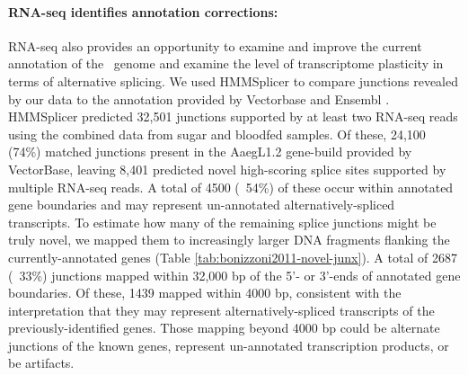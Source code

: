 \paragraph*{RNA-seq identifies annotation corrections:}





RNA-seq also provides an opportunity to examine and improve the current annotation of the \Aa\  genome and examine the level of transcriptome plasticity in terms of alternative splicing. We used HMMSplicer \cite{Dimon2010} to compare junctions revealed by our data to the annotation provided by Vectorbase and Ensembl \cite{Lawson2009,Hubbard2002}. HMMSplicer predicted 32,501 junctions supported by at least two RNA-seq reads using the combined data from sugar and bloodfed samples. Of these, 24,100 (74\%) matched junctions present in the AaegL1.2 gene-build provided by VectorBase, leaving 8,401 predicted novel high-scoring splice sites supported by multiple RNA-seq reads. A total of 4500 (~54\%) of these occur within annotated gene boundaries and may represent un-annotated alternatively-spliced transcripts. To estimate how many of the remaining splice junctions might be truly novel, we mapped them to increasingly larger DNA fragments flanking the currently-annotated genes (Table \ref{tab:bonizzoni2011-novel-junx}). A total of 2687 (~33\%) junctions mapped within 32,000 bp of the 5'- or 3'-ends of annotated gene boundaries. Of these, 1439 mapped within 4000 bp, consistent with the interpretation that they may represent alternatively-spliced transcripts of the previously-identified genes. Those mapping beyond 4000 bp could be alternate junctions of the known genes, represent un-annotated transcription products, or be artifacts.

